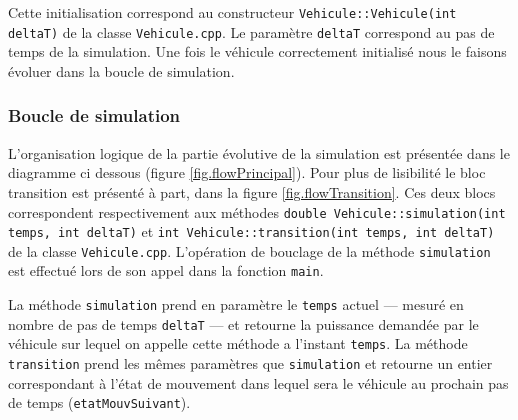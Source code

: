 \documentclass[10pt]{article}
\begin{document}
			Cette initialisation correspond au constructeur \texttt{Vehicule::Vehicule(int deltaT)} de la classe \texttt{Vehicule.cpp}. Le paramètre \texttt{deltaT} correspond au pas de temps de la simulation. Une fois le véhicule correctement initialisé nous le faisons évoluer dans la boucle de simulation.
	
		\subsubsection{Boucle de simulation \label{sec.descrSimulation}}
			
			L'organisation logique de la partie évolutive de la simulation est présentée dans le diagramme ci dessous (figure \ref{fig.flowPrincipal}). Pour plus de lisibilité le bloc transition est présenté à part, dans la figure \ref{fig.flowTransition}. Ces deux blocs correspondent respectivement aux méthodes \texttt{double Vehicule::simulation(int temps, int deltaT)} et \texttt{int Vehicule::transition(int temps, int deltaT)} de la classe \texttt{Vehicule.cpp}. L'opération de bouclage de la méthode \texttt{simulation} est effectué lors de son appel dans la fonction \texttt{main}.
			
			La méthode \texttt{simulation} prend en paramètre le \texttt{temps} actuel --- mesuré en nombre de pas de temps \texttt{deltaT} --- et retourne la puissance demandée par le véhicule sur lequel on appelle cette méthode a l'instant \texttt{temps}.
			La méthode \texttt{transition} prend les mêmes paramètres que \texttt{simulation} et retourne un entier correspondant à l'état de mouvement dans lequel sera le véhicule au prochain pas de temps (\texttt{etatMouvSuivant}).
			
			
		
\end{document}
